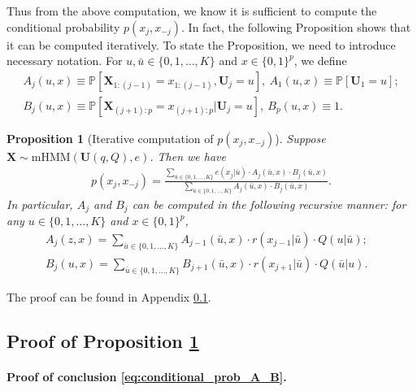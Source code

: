 \documentclass[12pt]{article}
\newtheorem{proposition}{Proposition}
\theoremstyle{definition}
\def\P{\mathbb{P}}
\def\P{\mathbb{P}}
\renewcommand{\P}{\mathbb{P}}							%
\newcommand{\prx}{\bm X}								%
\newcommand{\pru}{{\bm U}}								%
\begin{document}
Thus from the above computation, we know it is sufficient to compute the conditional probability $p(x_j,x_{-j})$. In fact, the following Proposition shows that it can be computed iteratively. To state the Proposition, we need to introduce necessary notation. For $u,\bar u\in\{0,1,\ldots,K\} $ and $x\in\{0,1\}^p$, we define 
\begin{align}
	A_j(u,x)\equiv \P[\prx_{1:(j-1)}=x_{1:(j-1)},\pru_j=u],\ A_1(u,x)\equiv \P[\pru_1=u];\label{eq:def_A}\\
  B_j(u,x)\equiv \P[\prx_{(j+1):p}=x_{(j+1):p}|\pru_j=u],\ B_p(u,x)\equiv1.\label{eq:def_B}
\end{align}

\begin{proposition}[Iterative computation of $p(x_j,x_{-j})$]\label{prop:conditional_prob}
	Suppose $\prx\sim \text{mHMM}(\pru(q,Q),e)$. Then we have
	\begin{align}\label{eq:conditional_prob_A_B}
		p(x_j,x_{-j})=\frac{\sum_{\bar u\in\{0,1,\ldots,K\}}e(x_j|\bar u)\cdot A_j(\bar u,x)\cdot B_j(\bar u,x)}{\sum_{\bar u\in \{0,1,\ldots,K\}}A_j(\bar u,x)\cdot B_j(\bar u,x)}.
	\end{align}
	In particular, $A_j$ and $B_j$ can be computed in the following recursive manner: for any $u\in\{0,1,\ldots,K\}$ and $x\in\{0,1\}^{p}$, 
	\begin{align*}
		A_j(z,x)=\sum_{\bar u\in\{0,1,\ldots,K\}}A_{j-1}(\bar u,x)\cdot r(x_{j-1}|\bar u)\cdot Q(u|\bar u);&\\
		B_j(u,x)=\sum_{\bar u\in\{0,1,\ldots,K\}}B_{j+1}(\bar u,x)\cdot r(x_{j+1}|\bar u)\cdot Q(\bar u|u).&
	\end{align*}
\end{proposition}
The proof can be found in Appendix \ref{sec:conditional_prob}.


\subsection{Proof of Proposition \ref{prop:conditional_prob}}\label{sec:conditional_prob}

\paragraph{Proof of conclusion \eqref{eq:conditional_prob_A_B}.}
\end{document}
